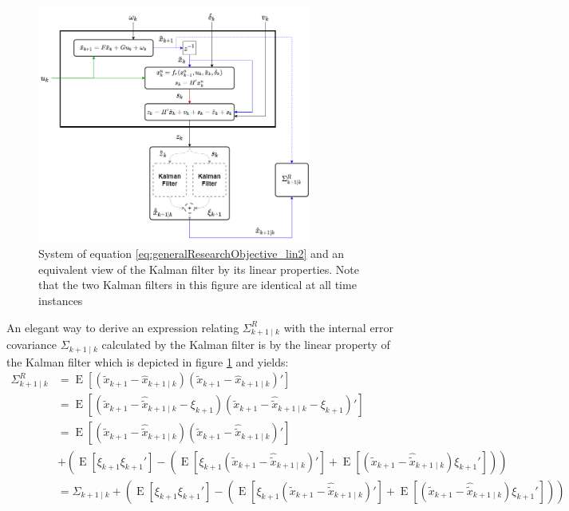 \documentclass[oneside,12pt]{article}
\begin{document}
%
\begin{figure}
    \centering
        \includegraphics[width=0.8\textwidth]{./Radar-general-discrete02}
        \caption{\label{fig:Radar-general-discrete02}System of equation \ref{eq:generalResearchObjective_lin2} and an equivalent view of the Kalman filter by its linear properties. Note that the two Kalman filters in this figure are identical at all time instances}
\end{figure}
%
An elegant way to derive an expression relating $\Sigma^R_{k+1 \mid k}$ with the internal error covariance $\Sigma_{k+1 \mid k}$ calculated by the Kalman filter is by the linear property of the Kalman filter which is depicted in figure \ref{fig:Radar-general-discrete02} and yields: 
%
\begin{equation}\label{eq:errCov_linSplit}
    \begin{split}
        \Sigma^R_{k+1 \mid k} &= \operatorname{E}[(\tilde{x}_{k+1}-\hat{x}_{k+1 \mid k})(\tilde{x}_{k+1}-\hat{x}_{k+1 \mid k})']\\
        &= \operatorname{E}[(\tilde{x}_{k+1}- \hat{\tilde{x}}_{k+1 \mid k} - \xi_{k+1})(\tilde{x}_{k+1}- \hat{\tilde{x}}_{k+1 \mid k} - \xi_{k+1})']\\
        &= \operatorname{E}[(\tilde{x}_{k+1}- \hat{\tilde{x}}_{k+1 \mid k})(\tilde{x}_{k+1}- \hat{\tilde{x}}_{k+1 \mid k})']\\
        &+ \left(\operatorname{E}[\xi_{k+1}\xi_{k+1}'] - \left( \operatorname{E}[\xi_{k+1}(\tilde{x}_{k+1}- \hat{\tilde{x}}_{k+1 \mid k})'] +  \operatorname{E}[(\tilde{x}_{k+1} - \hat{\tilde{x}}_{k+1 \mid k})\xi_{k+1}'] \right) \right)\\
        &= \Sigma_{k+1 \mid k} + \left(\operatorname{E}[\xi_{k+1}\xi_{k+1}'] - \left( \operatorname{E}[\xi_{k+1}(\tilde{x}_{k+1}- \hat{\tilde{x}}_{k+1 \mid k})'] +  \operatorname{E}[(\tilde{x}_{k+1}- \hat{\tilde{x}}_{k+1 \mid k})\xi_{k+1}'] \right) \right)
    \end{split}
\end{equation}         
\end{document}
